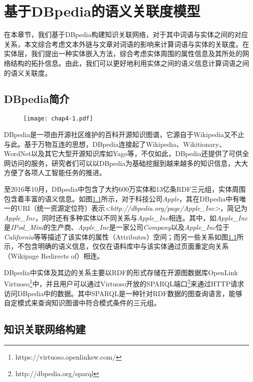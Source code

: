 \chapter{基于DBpedia的语义关联度模型}
\label{chap:chap04}

在本章节，我们基于DBpedia构建知识关联网络，对于其中词语与实体之间的对应关系，本文综合考虑文本外链与文章对词语的影响来计算词语与实体的关联度。在实体层，我们提出一种实体嵌入方法，综合考虑实体周围的属性信息及其所处的网络结构的拓扑信息。由此，我们可以更好地利用实体之间的语义信息计算词语之间的语义关联度。

\section{DBpedia简介}

\begin{figure}[!ht]
    \centerline{\texttt{[image: chap4-1.pdf]}}
    \label{chap4-1}
\end{figure}

DBpedia是一项由开源社区维护的百科开源知识图谱，它源自于Wikipedia又不止与此。基于万物互连的思想，DBpedia连接起了Wikipedia、Wikitionary、WordNet以及其它大型开源知识库如Yago等，不仅如此，DBpedia还提供了可供全网访问的服务，研究者们可以以DBpedia为基础挖掘到越来越多的知识信息，大大方便了各项人工智能任务的推进。

至2016年10月，DBpedia中包含了大约600万实体和13亿条RDF三元组，实体周围包含着丰富的语义信息。如图\ref{chap4-1}所示，对于科技公司\emph{Apple}，其在DBpedia中有唯一的URI（统一资源定位符）表示\emph{<http://dbpedia.org/page/Apple\_Inc>}，简记为\emph{Apple\_Inc}，同时还有多种实体以不同关系与\emph{Apple\_Inc}相连。其中，如\emph{Apple\_Inc}是\emph{IPod\_Mini}的生产商、\emph{Apple\_Inc}是一家公司\emph{Company}以及\emph{Apple\_Inc}位于\emph{California}等等描述了该实体的属性（Attributes）空间；而另一些关系如图\ref{chap4-1}所示，不包含明确的语义信息，仅仅在语料库中与该实体通过页面重定向关系（Wikipage Redirects of）相连。

DBpedia中实体及其边的关系主要以RDF的形式存储在开源图数据库OpenLink Virtuoso\footnote{https://virtuoso.openlinksw.com/}中，并且用户可以通过Virtuoso开放的SPARQL端口\footnote{http://dbpedia.org/sparql}来通过HTTP请求访问DBpedia中的数据。其中SPARQL是一种针对RDF数据的图查询语言，能够自定模式来查询知识图谱中符合模式条件的三元组。


\section{知识关联网络构建}

